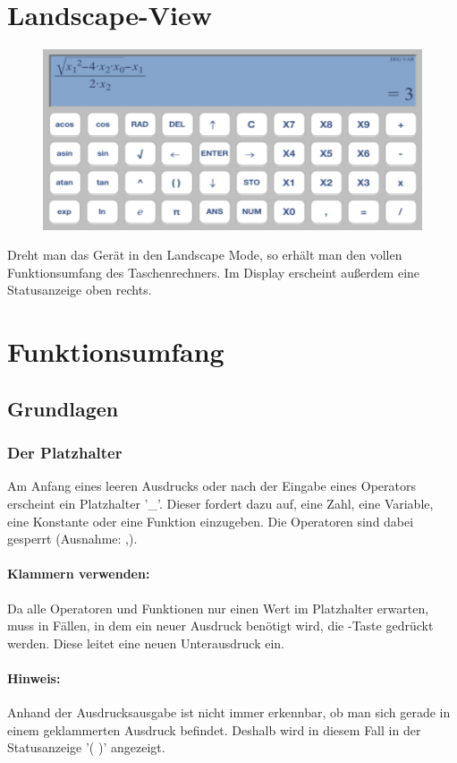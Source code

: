 \section{Landscape-View}
\begin{figure}[H]
	\centering
	\includegraphics[width=1\textwidth]{landscape.png}
\end{figure}
Dreht man das Gerät in den Landscape Mode, so erhält man den vollen Funktionsumfang des Taschenrechners. 
Im Display erscheint außerdem eine Statusanzeige oben rechts.
\section{Funktionsumfang}
\subsection{Grundlagen}
\subsubsection{Der Platzhalter}
Am Anfang eines leeren Ausdrucks oder nach der Eingabe eines Operators erscheint ein Platzhalter '\_'. 
Dieser fordert dazu auf, eine Zahl, eine Variable, eine Konstante oder eine Funktion einzugeben. Die Operatoren sind dabei gesperrt (Ausnahme: \key{-},\key{/}).

\paragraph{Klammern verwenden:}
Da alle Operatoren und Funktionen nur einen Wert im Platzhalter erwarten, muss in Fällen,
in dem ein neuer Ausdruck benötigt wird, die \key{( )}-Taste gedrückt werden. 
Diese leitet eine neuen Unterausdruck ein.
\paragraph{Hinweis:} Anhand der Ausdrucksausgabe ist nicht immer erkennbar, ob man sich gerade in einem geklammerten Ausdruck befindet. Deshalb wird in diesem Fall in der Statusanzeige '( )' angezeigt. 
